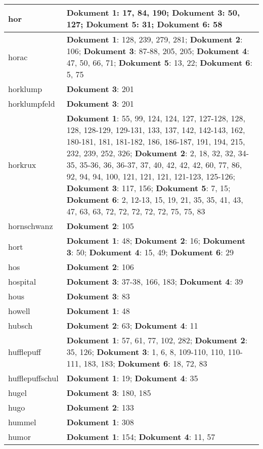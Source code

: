 \documentclass[a5paper]{article}
\begin{document}
\begin{longtable}[l]{|l|p{3in}|}
\hline
hor & \textbf{Dokument 1}: 17, 84, 190; \textbf{Dokument 3}: 50, 127; \textbf{Dokument 5}: 31; \textbf{Dokument 6}: 58 \\
\hline
horac & \textbf{Dokument 1}: 128, 239, 279, 281; \textbf{Dokument 2}: 106; \textbf{Dokument 3}: 87-88, 205, 205; \textbf{Dokument 4}: 47, 50, 66, 71; \textbf{Dokument 5}: 13, 22; \textbf{Dokument 6}: 5, 75 \\
\hline
horklump & \textbf{Dokument 3}: 201 \\
\hline
horklumpfeld & \textbf{Dokument 3}: 201 \\
\hline
horkrux & \textbf{Dokument 1}: 55, 99, 124, 124, 127, 127-128, 128, 128, 128-129, 129-131, 133, 137, 142, 142-143, 162, 180-181, 181, 181-182, 186, 186-187, 191, 194, 215, 232, 239, 252, 326; \textbf{Dokument 2}: 2, 18, 32, 32, 34-35, 35-36, 36, 36-37, 37, 40, 42, 42, 42, 60, 77, 86, 92, 94, 94, 100, 121, 121, 121, 121-123, 125-126; \textbf{Dokument 3}: 117, 156; \textbf{Dokument 5}: 7, 15; \textbf{Dokument 6}: 2, 12-13, 15, 19, 21, 35, 35, 41, 43, 47, 63, 63, 72, 72, 72, 72, 72, 75, 75, 83 \\
\hline
hornschwanz & \textbf{Dokument 2}: 105 \\
\hline
hort & \textbf{Dokument 1}: 48; \textbf{Dokument 2}: 16; \textbf{Dokument 3}: 50; \textbf{Dokument 4}: 15, 49; \textbf{Dokument 6}: 29 \\
\hline
hos & \textbf{Dokument 2}: 106 \\
\hline
hospital & \textbf{Dokument 3}: 37-38, 166, 183; \textbf{Dokument 4}: 39 \\
\hline
hous & \textbf{Dokument 3}: 83 \\
\hline
howell & \textbf{Dokument 1}: 48 \\
\hline
hubsch & \textbf{Dokument 2}: 63; \textbf{Dokument 4}: 11 \\
\hline
hufflepuff & \textbf{Dokument 1}: 57, 61, 77, 102, 282; \textbf{Dokument 2}: 35, 126; \textbf{Dokument 3}: 1, 6, 8, 109-110, 110, 110-111, 183, 183; \textbf{Dokument 6}: 18, 72, 83 \\
\hline
hufflepuffschul & \textbf{Dokument 1}: 19; \textbf{Dokument 4}: 35 \\
\hline
hugel & \textbf{Dokument 3}: 180, 185 \\
\hline
hugo & \textbf{Dokument 2}: 133 \\
\hline
hummel & \textbf{Dokument 1}: 308 \\
\hline
humor & \textbf{Dokument 1}: 154; \textbf{Dokument 4}: 11, 57 \\

\end{longtable}
\end{document}
